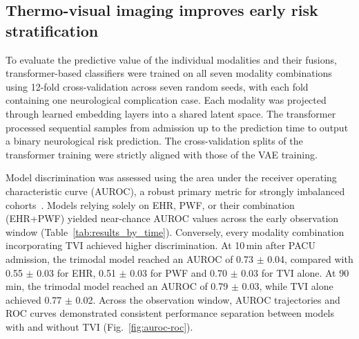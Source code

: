 \documentclass[11pt]{article}
\begin{document}
\clearpage

\subsection*{Thermo-visual imaging improves early risk stratification}

To evaluate the predictive value of the individual modalities and their fusions, transformer-based classifiers were trained on all seven modality combinations using 12-fold cross-validation across seven random seeds, with each fold containing one neurological complication case. Each modality was projected through learned embedding layers into a shared latent space. The transformer processed sequential samples from admission up to the prediction time to output a binary neurological risk prediction. The cross-validation splits of the transformer training were strictly aligned with those of the VAE training.

Model discrimination was assessed using the area under the receiver operating characteristic curve (AUROC), a robust primary metric for strongly imbalanced cohorts~\citep{mcdermott2024closer, richardson2024receiver}. Models relying solely on EHR, PWF, or their combination (EHR+PWF) yielded near-chance AUROC values across the early observation window (Table~\ref{tab:results_by_time}). Conversely, every modality combination incorporating TVI achieved higher discrimination. At 10\,min after PACU admission, the trimodal model reached an AUROC of 0.73 $\pm$ 0.04, compared with 0.55 $\pm$ 0.03 for EHR, 0.51 $\pm$ 0.03 for PWF and 0.70 $\pm$ 0.03 for TVI alone. At 90\,min, the trimodal model reached an AUROC of 0.79 $\pm$ 0.03, while TVI alone achieved 0.77 $\pm$ 0.02. Across the observation window, AUROC trajectories and ROC curves demonstrated consistent performance separation between models with and without TVI (Fig.~\ref{fig:auroc-roc}).
\end{document}

